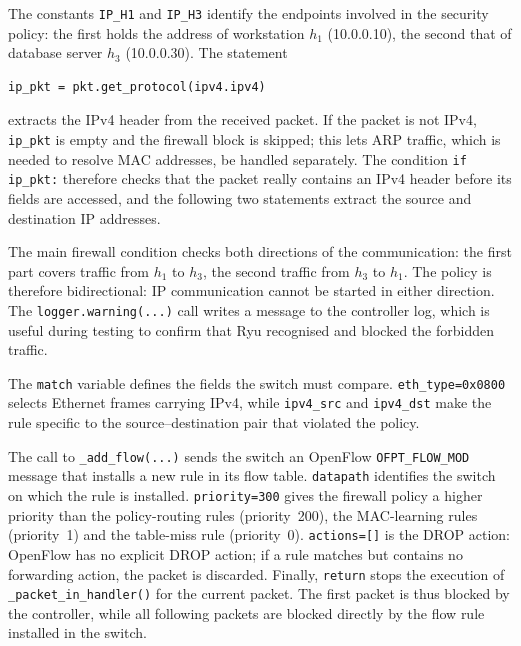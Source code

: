 \documentclass[11pt,a4paper]{article}
\newcommand{\code}[1]{\texttt{#1}}
\begin{document}
The constants \code{IP\_H1} and \code{IP\_H3} identify the endpoints involved in
the security policy: the first holds the address of workstation $h_1$
(10.0.0.10), the second that of database server $h_3$ (10.0.0.30). The
statement
\begin{lstlisting}[style=py]
ip_pkt = pkt.get_protocol(ipv4.ipv4)
\end{lstlisting}
extracts the IPv4 header from the received packet. If the packet is not IPv4,
\code{ip\_pkt} is empty and the firewall block is skipped; this lets ARP traffic,
which is needed to resolve MAC addresses, be handled separately. The condition
\code{if ip\_pkt:} therefore checks that the packet really contains an IPv4
header before its fields are accessed, and the following two statements extract
the source and destination IP addresses.

The main firewall condition checks both directions of the communication: the
first part covers traffic from $h_1$ to $h_3$, the second traffic from $h_3$ to
$h_1$. The policy is therefore bidirectional: IP communication cannot be started
in either direction. The \code{logger.warning(...)} call writes a message to the
controller log, which is useful during testing to confirm that Ryu recognised
and blocked the forbidden traffic.

The \code{match} variable defines the fields the switch must compare.
\code{eth\_type=0x0800} selects Ethernet frames carrying IPv4, while
\code{ipv4\_src} and \code{ipv4\_dst} make the rule specific to the
source--destination pair that violated the policy.

The call to \code{\_add\_flow(...)} sends the switch an OpenFlow
\code{OFPT\_FLOW\_MOD} message that installs a new rule in its flow table.
\code{datapath} identifies the switch on which the rule is installed.
\code{priority=300} gives the firewall policy a higher priority than the
policy-routing rules (priority~200), the MAC-learning rules (priority~1) and the
table-miss rule (priority~0). \code{actions=[]} is the DROP action: OpenFlow has
no explicit DROP action; if a rule matches but contains no forwarding action,
the packet is discarded. Finally, \code{return} stops the execution of
\code{\_packet\_in\_handler()} for the current packet. The first packet is thus
blocked by the controller, while all following packets are blocked directly by
the flow rule installed in the switch.

\end{document}
